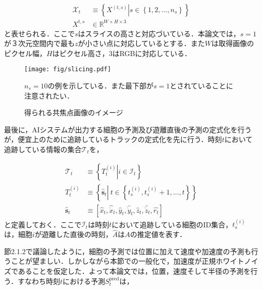 \begin{equation}
    \label{eq:input_images}
    \begin{aligned}
        \mathcal{X}_t &\equiv \left\{ \left.X^{(t,s)}\right| s \in \left\{1,2,\dots,n_s\right\} \right\}
        \\ X^{t,s} &\in \mathbb{R}^{W \times H \times 3}
    \end{aligned}
\end{equation}
と表せられる．ここで$s$はスライスの高さと対応づいている．本論文では，$s=1$が３次元空間内で最も$z$が小さい点に対応しているとする．また$W$は取得画像のピクセル幅，$H$はピクセル高さ，$3$はRGBに対応している．

\begin{figure}[t]
    \centering
    \texttt{[image: fig/slicing.pdf]}
    \caption{得られる共焦点画像のイメージ}
    \small
    $n_s=10$の例を示している．また最下部が$s=1$とされていることに注意されたい．
    \label{fig:slicing}
\end{figure}

\par
最後に，AIシステムが出力する細胞の予測及び遊離直後の予測の定式化を行うが，便宜上のために追跡しているトラックの定式化を先に行う．時刻$t$において追跡している情報の集合$\mathcal{T}_t$を，

\begin{equation}
    \begin{aligned}
        \mathcal{T}_t &\equiv \left\{ \left. T_t^{(i)}\right|i \in \mathcal{I}_t\right\}
        \\ T_t^{(i)} &\equiv \left\{ \hat{\bm{s}}_t \left|\ t \in \left\{t_s^{(i)}, t_s^{(i)}+1,\dots, t\right\} \right.\right\}
        \\\hat{\bm{s}}_{t} &\equiv \left[\hat{x}_{t}, \hat{\dot{x}}_{t}, \hat{y}_{t}, \hat{\dot{y}}_{t}, \hat{z}_{t}, \hat{\dot{z}}_{t}, \hat{r_{t}}\right]
    \end{aligned}
\end{equation}
と定義しておく．ここで$\mathcal{I}_t$は時刻$t$において追跡している細胞のID集合，$t_s^{(i)}$は，細胞$i$が遊離した直後の時刻，$\hat{A}$は$A$の推定値を表す．

節2.1.2で議論したように，細胞の予測では位置に加えて速度や加速度の予測も行うことが望ましい．しかしながら本節での一般化で，加速度が正規ホワイトノイズであることを仮定した．よって本論文では，位置，速度そして半径の予測を行う．すなわち時刻$t$における予測$S^{\text{pred}}_t$は，

